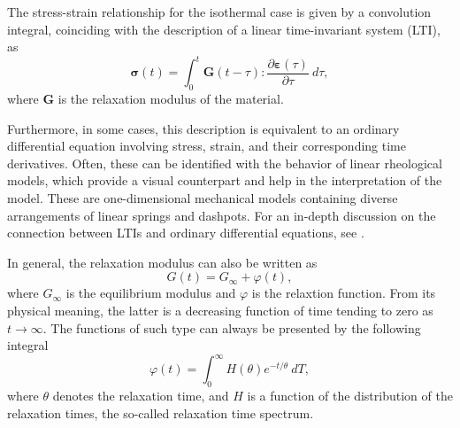 The stress-strain relationship for the isothermal case is given by a convolution integral, coinciding with the description of a linear time-invariant system (LTI), as
\begin{equation}
\label{eq:stress_constitutive_infinitesimal_viscoelasticity}
	\bm \sigma(t) = \int_0^t \mathbf G(t-\tau):\frac{\partial \bm \varepsilon(\tau)}{\partial \tau}\ d\tau,
\end{equation}
where $\mathbf{G}$ is the relaxation modulus of the material.

Furthermore, in some cases, this description is equivalent to an ordinary differential equation involving stress, strain, and their corresponding time derivatives.
Often, these can be identified with the behavior of linear rheological models, which provide a visual counterpart and help in the interpretation of the model.
These are one-dimensional mechanical models containing diverse arrangements of linear springs and dashpots.
For an in-depth discussion on the connection between LTIs and ordinary differential equations, see \cite{ciampaLinearDifferentialEquations2019}.

In general, the relaxation modulus can also be written as \citep{malkinRheologyConceptsMethods2017}
\begin{equation}
\label{eq:relax_mod_decomp}
	G(t) = G_\infty + \varphi(t),
\end{equation}
where $G_\infty$ is the equilibrium modulus and $\varphi$ is the relaxtion function.
From its physical meaning, the latter is a decreasing function of time tending to zero as $t\to\infty$.
The functions of such type can always be presented by the following integral
\begin{equation}
  \label{eq:relax_time_spectrum}
	\varphi(t) = \int_0^\infty H(\theta) e^{-t/\theta}\ dT,
\end{equation}
where $\theta$ denotes the relaxation time, and $H$ is a function of the distribution of the relaxation times, the so-called relaxation time spectrum.

